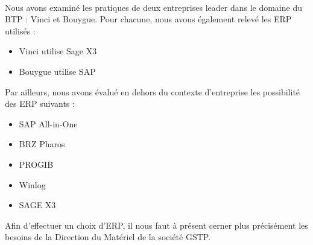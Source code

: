 \hfill\\

Nous avons examiné les pratiques de deux entreprises leader dans le domaine
du BTP : Vinci et Bouygue. Pour chacune, nous avons également relevé les
ERP utilisés :

\begin{itemize}
\item Vinci utilise Sage X3
\item Bouygue utilise SAP
\end{itemize}


Par ailleurs, nous avons évalué en dehors du contexte d'entreprise les possibilité des ERP suivants :

\begin{itemize}
\item SAP All-in-One
\item BRZ Pharos
\item PROGIB
\item Winlog
\item SAGE X3
\end{itemize}

\vskip 6pt

Afin d'effectuer un choix d'ERP, il nous faut à présent cerner plus
précisément les besoins de la Direction du Matériel de la société GSTP.

\pagebreak
